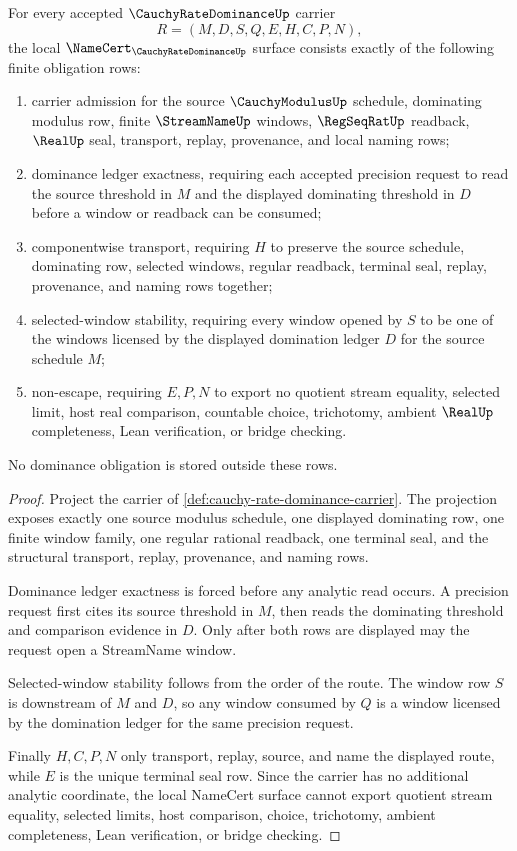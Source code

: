 \begin{theorem}
\label{thm:cauchy-rate-dominance-namecert-obligations}
For every accepted $\CauchyRateDominanceUp$ carrier
$$
R=(M,D,S,Q,E,H,C,P,N),
$$
the local $\NameCert_{\CauchyRateDominanceUp}$ surface consists exactly of the following finite obligation rows:
\begin{enumerate}
\item carrier admission for the source $\CauchyModulusUp$ schedule, dominating modulus row, finite $\StreamNameUp$ windows, $\RegSeqRatUp$ readback, $\RealUp$ seal, transport, replay, provenance, and local naming rows;
\item dominance ledger exactness, requiring each accepted precision request to read the source threshold in $M$ and the displayed dominating threshold in $D$ before a window or readback can be consumed;
\item componentwise transport, requiring $H$ to preserve the source schedule, dominating row, selected windows, regular readback, terminal seal, replay, provenance, and naming rows together;
\item selected-window stability, requiring every window opened by $S$ to be one of the windows licensed by the displayed domination ledger $D$ for the source schedule $M$;
\item non-escape, requiring $E,P,N$ to export no quotient stream equality, selected limit, host real comparison, countable choice, trichotomy, ambient $\RealUp$ completeness, Lean verification, or bridge checking.
\end{enumerate}
No dominance obligation is stored outside these rows.
\end{theorem}
\begin{proof}
Project the carrier of \autoref{def:cauchy-rate-dominance-carrier}. The projection exposes exactly one source modulus schedule, one displayed dominating row, one finite window family, one regular rational readback, one terminal seal, and the structural transport, replay, provenance, and naming rows.

Dominance ledger exactness is forced before any analytic read occurs. A precision request first cites its source threshold in $M$, then reads the dominating threshold and comparison evidence in $D$. Only after both rows are displayed may the request open a StreamName window.

Selected-window stability follows from the order of the route. The window row $S$ is downstream of $M$ and $D$, so any window consumed by $Q$ is a window licensed by the domination ledger for the same precision request.

Finally $H,C,P,N$ only transport, replay, source, and name the displayed route, while $E$ is the unique terminal seal row. Since the carrier has no additional analytic coordinate, the local NameCert surface cannot export quotient stream equality, selected limits, host comparison, choice, trichotomy, ambient completeness, Lean verification, or bridge checking.
\end{proof}

